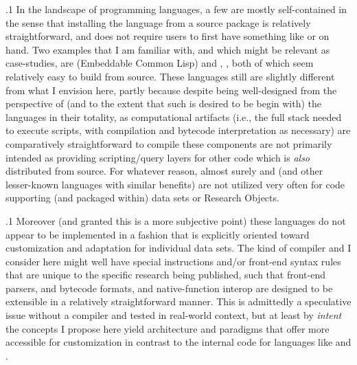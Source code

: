 \documentclass[11pt, twocolumn]{article}
\begin{document}
\p.1{%
In the landscape of programming languages, a few are
mostly self-contained in the sense that installing the
language from a source package is relatively straightforward,
and does not require users to first have something like
 or  on hand. Two examples that I
am familiar with, and which might be relevant as case-studies,
are  (Embeddable Common Lisp)
and  , ,
both of which seem relatively easy to build from source. These
languages still are slightly different from what I envision
here, partly because \mdash{} despite being well-designed from the
perspective of (and to the extent that such is desired to be
begin with) the languages in their totality, as
computational artifacts (i.e., the full stack needed to
execute scripts, with compilation and bytecode interpretation
as necessary) are comparatively straightforward to compile \mdash{} these
components are not primarily intended as providing
scripting/query layers for other code which is \textit{also}
distributed from source. For whatever reason,
almost surely  and  (and
other lesser-known languages with similar benefits) are not utilized very
often for code supporting (and packaged within)
data sets or Research Objects.
}%

\p.1{%
Moreover (and granted this is a more subjective point) these languages
do not appear to be implemented in a fashion that is
explicitly oriented toward customization and adaptation
for individual data sets. The kind of compiler and
 I consider here might well have special instructions
and/or front-end syntax rules that are unique to
the specific research being published, such that
front-end parsers,  and bytecode formats, and native-function
interop are designed to be extensible in a relatively
straightforward manner. This is admittedly a speculative
issue without a compiler and  tested in real-world context,
but at least by \textit{intent} the concepts I propose
here yield architecture and paradigms that offer more
accessible  for customization in contrast to
the internal code for languages like  and .
}%
\end{document}
